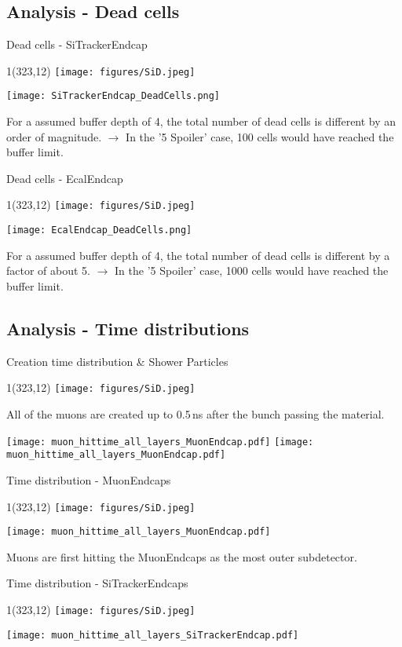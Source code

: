 \documentclass[xcolor={dvipsnames}]{beamer}
\newcommand{\sidlogo}{
  \setlength{\TPHorizModule}{1pt}
  \setlength{\TPVertModule}{1pt}
  \begin{textblock}{1}(323,12)
   \texttt{[image: figures/SiD.jpeg]}
  \end{textblock}
  }
\begin{document}
\subsection{Analysis - Dead cells}
\begin{frame}{Dead cells - \small SiTrackerEndcap}
\sidlogo
 \begin{center}
\texttt{[image: SiTrackerEndcap\_DeadCells.png]}
\end{center}
\small For a assumed buffer depth of 4, the total number of dead cells is different by an order of magnitude. $\rightarrow$ In the '5 Spoiler' case, 100 cells would have reached the buffer limit.
\end{frame}
\begin{frame}{Dead cells - \small EcalEndcap}
\sidlogo
 \begin{center}
\texttt{[image: EcalEndcap\_DeadCells.png]}
\end{center}
\small For a assumed buffer depth of 4, the total number of dead cells is different by a factor of about 5. $\rightarrow$ In the '5 Spoiler' case, 1000 cells would have reached the buffer limit.
\end{frame}

\subsection{Analysis - Time distributions}
\begin{frame}{Creation time distribution \& Shower Particles}
\sidlogo
All of the muons are created up to 0.5\,ns after the bunch passing the material.
 \begin{center}
\texttt{[image: muon\_hittime\_all\_layers\_MuonEndcap.pdf]}
\texttt{[image: muon\_hittime\_all\_layers\_MuonEndcap.pdf]}
\end{center}
\end{frame}
\begin{frame}{Time distribution - \small MuonEndcaps}
\sidlogo
 \begin{center}
\texttt{[image: muon\_hittime\_all\_layers\_MuonEndcap.pdf]}
\end{center}
Muons are first hitting the MuonEndcaps as the most outer subdetector.
\end{frame}
\begin{frame}{Time distribution - \small SiTrackerEndcaps}
\sidlogo
 \begin{center}
\texttt{[image: muon\_hittime\_all\_layers\_SiTrackerEndcap.pdf]}
\end{center}
\end{frame}
\end{document}

